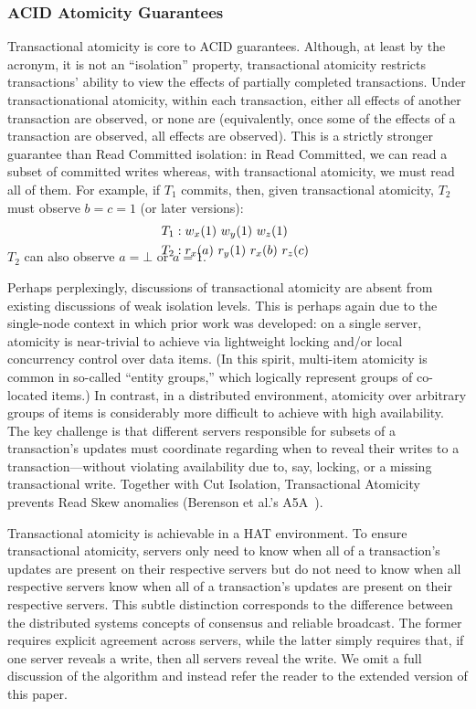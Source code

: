 \subsubsection{ACID Atomicity Guarantees}

Transactional atomicity is core to ACID guarantees. Although, at least
by the acronym, it is not an ``isolation'' property, transactional
atomicity restricts transactions' ability to view the effects of
partially completed transactions. Under transactionational atomicity,
within each transaction, either all effects of another transaction are
observed, or none are (equivalently, once some of the effects of a
transaction are observed, all effects are observed). This is a
strictly stronger guarantee than Read Committed isolation: in Read
Committed, we can read a subset of committed writes whereas, with
transactional atomicity, we must read all of them. For example, if
$T_1$ commits, then, given transactional atomicity, $T_2$ must observe
$b=c=1$ (or later versions):
\vspace{-.5em}
\begin{align*}
\small
T_1 &: w_x(1)~w_y(1)~w_z(1)
\\T_2 &: r_x(a)~r_y(1)~r_x(b)~r_z(c)~\\[-1.5em]
\end{align*}
$T_2$ can also observe $a=\bot$ or $a=1$.

Perhaps perplexingly, discussions of transactional atomicity are
absent from existing discussions of weak isolation levels. This is
perhaps again due to the single-node context in which prior work was
developed: on a single server, atomicity is near-trivial to achieve
via lightweight locking and/or local concurrency control over data
items. (In this spirit, multi-item atomicity is common in so-called
``entity groups,'' which logically represent groups of co-located
items.) In contrast, in a distributed environment, atomicity over
arbitrary groups of items is considerably more difficult to achieve
with high availability. The key challenge is that different servers
responsible for subsets of a transaction's updates must coordinate
regarding when to reveal their writes to a transaction---without
violating availability due to, say, locking, or a missing
transactional write. Together with Cut Isolation, Transactional
Atomicity prevents Read Skew anomalies (Berenson et al.'s
A5A~\cite{ansicritique}).

Transactional atomicity is achievable in a HAT environment. To ensure
transactional atomicity, servers only need to know when all of a
transaction's updates are present on their respective servers but do
not need to know when all respective servers know when all of a
transaction's updates are present on their respective servers. This
subtle distinction corresponds to the difference between the
distributed systems concepts of consensus and reliable broadcast. The
former requires explicit agreement across servers, while the latter
simply requires that, if one server reveals a write, then all servers
reveal the write. We omit a full discussion of the algorithm and
instead refer the reader to the extended version of this paper.

